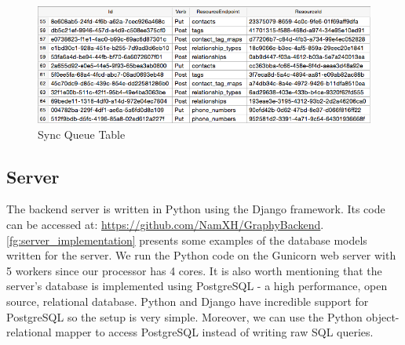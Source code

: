 \begin{figure}[!h]
\begin{centering}
\includegraphics[scale=0.63]{pics/sync_queue.png}
\caption{Sync Queue Table}\label{fg:sync_queue}
\end{centering}
\end{figure}

\subsection{Server}
The backend server is written in Python using the Django framework. Its code can be accessed at: \url{https://github.com/NamXH/GraphyBackend}. \autoref{fg:server_implementation} presents some examples of the database models written for the server. We run the Python code on the Gunicorn web server with 5 workers since our processor has 4 cores. It is also worth mentioning that the server's database is implemented using PostgreSQL - a high performance, open source, relational database. Python and Django have incredible support for PostgreSQL so the setup is very simple. Moreover, we can use the Python object-relational mapper to access PostgreSQL instead of writing raw SQL queries.

